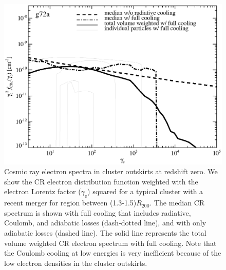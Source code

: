 \documentclass[useAMS,usenatbib]{mn2e}
\def\del#1{{}}
\newcommand{\e}{\mathrm{e}}
\newcommand{\rvir}{R_{200}}
\newcommand{\gam}{\gamma}
\begin{document}
\begin{figure}
  \includegraphics[width=1.0\columnwidth]{./figures/CRespec.g72a.1.4Rv.a24.full.140.v20.eps}
  \caption{Cosmic ray electron spectra in cluster outskirts at
    redshift zero. We show the CR electron distribution function
    weighted with the electron Lorentz factor ($\gam_\e$) squared for
    a typical cluster with a recent merger for region between
    (1.3-1.5)$\rvir$. The median CR spectrum is shown with full
    cooling that includes radiative, Coulomb, and adiabatic losses
    (dash-dotted line), and with only adiabatic losses (dashed
    line). The solid line represents the total volume weighted CR
    electron spectrum with full cooling. Note that the Coulomb cooling
    at low energies is very inefficient because of the low electron
    densities in the cluster outskirts.\label{fig:e_spec_g72a}}
\end{figure}

\del{
\begin{figure}
\begin{minipage}{2.0\columnwidth}
  \caption{Cosmic ray electron spectra in cluster outskirts at
    redshift zero. We show the CR electron distribution function
    weighted with the electron Lorentz factor ($\gam_\e$)
    squared. In the {\it left panel} panel we show the CR electron in
    the region between (0.3-0.5)$\rvir$ and in the {\it right panel}
    between (1.3-1.5)$\rvir$. The solid lines show the median CR
    electron spectrum where both radiative and adiabatic losses are
    included. The dotted lines shows the 68 percentiles. The dashed
    lines show the CR electron spectrum without Coulomb and radiative
    cooling. Note that the Coulomb cooling at low energies is very
    inefficient because of the low electron densities in the cluster
    outskirts. \label{fig:e_spec}}
\end{minipage}
\end{figure}
}
\end{document}
